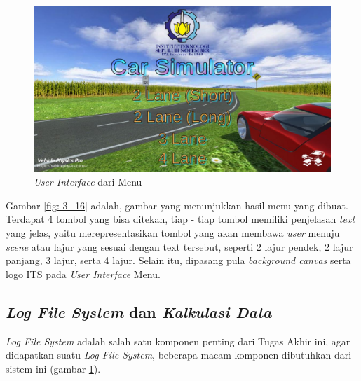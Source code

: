     \begin{figure} [!htb]
	    \captionsetup{justification=centering}
	    \includegraphics[scale=0.35]{img/menuUI.JPG}
	    \caption{\textit{User Interface} dari Menu}
	    \label{fig: 3_15}
    \end{figure}
    
    Gambar \ref{fig: 3_16} adalah, gambar yang menunjukkan hasil menu yang dibuat. Terdapat 4 tombol yang bisa ditekan, tiap - tiap tombol memiliki penjelasan \textit{text} yang jelas, yaitu merepresentasikan tombol yang akan membawa \textit{user} menuju \textit{scene} atau lajur yang sesuai dengan text tersebut, seperti 2 lajur pendek, 2 lajur panjang, 3 lajur, serta 4 lajur. Selain itu, dipasang pula \textit{background canvas} serta logo ITS pada \textit{User Interface} Menu.
    
    \subsection{\textit{Log File System} dan \textit{Kalkulasi Data}} 
    \label{logfilesystem}
    
    \textit{Log File System} adalah salah satu komponen penting dari Tugas Akhir ini, agar didapatkan suatu \textit{Log File System}, beberapa macam komponen dibutuhkan dari sistem ini (gambar \ref{fig: 3_15}).
    
